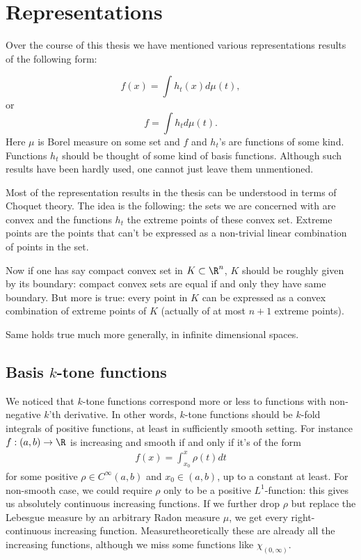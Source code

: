 \chapter{Representations}

Over the course of this thesis we have mentioned various representations results of the following form:

\[
f(x) = \int h_{t}(x) d \mu (t),
\]
or
\[
f = \int h_{t} d \mu(t).
\]
Here $\mu$ is Borel measure on some set and $f$ and $h_{t}$'s are functions of some kind. Functions $h_{t}$ should be thought of some kind of basis functions. Although such results have been hardly used, one cannot just leave them unmentioned.

Most of the representation results in the thesis can be understood in terms of Choquet theory. The idea is the following: the sets we are concerned with are convex and the functions $h_{t}$ the extreme points of these convex set. Extreme points are the points that can't be expressed as a non-trivial linear combination of points in the set.

Now if one has say compact convex set in $K \subset \R^{n}$, $K$ should be roughly given by its boundary: compact convex sets are equal if and only they have same boundary. But more is true: every point in $K$ can be expressed as a convex combination of extreme points of $K$ (actually of at most $n + 1$ extreme points).

Same holds true much more generally, in infinite dimensional spaces.

\section{Basis $k$-tone functions}

We noticed that $k$-tone functions correspond more or less to functions with non-negative $k$'th derivative. In other words, $k$-tone functions should be $k$-fold integrals of positive functions, at least in sufficiently smooth setting. For instance $f : (a, b) \to \R$ is increasing and smooth if and only if it's of the form
\begin{align}\label{increasing_repr}
	f(x) = \int_{x_{0}}^{x} \rho(t) dt
\end{align}
for some positive $\rho \in C^{\infty}(a, b)$ and $x_{0} \in (a, b)$, up to a constant at least. For non-smooth case, we could require $\rho$ only to be a positive $L^{1}$-function: this gives us absolutely continuous increasing functions. If we further drop $\rho$ but replace the Lebesgue measure by an arbitrary Radon measure $\mu$, we get every right-continuous increasing function. Measuretheoretically these are already all the increasing functions, although we miss some functions like $\chi_{(0, \infty)}$.

